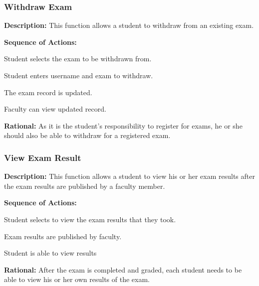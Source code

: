    \subsubsection{\large Withdraw Exam} 
   \begin{boxed} %
      \textbf{Description:}
      {\small This function allows a student to withdraw from an existing exam.}
         
         \textbf{Sequence of Actions:}
         \begin{enumerate}
               {\small
            \item Student selects the exam to be withdrawn from.
            \item Student enters username and exam to withdraw.
            \item The exam record is updated.
            \item Faculty can view updated record.}
         \end{enumerate}

         \textbf{Rational:}
         {\small As it is the student's responsibility to register for exams, he or she
         should also be able to withdraw for a registered exam.}
   \end{boxed} %

   \subsubsection{\large View Exam Result} 
   \begin{boxed} %
      \textbf{Description:}
      {\small This function allows a student to view his or her exam results after
      the exam results are published by a faculty member.}
         
         \textbf{Sequence of Actions:}
         \begin{enumerate}
               {\small
            \item Student selects to view the exam results that they took.
            \item Exam results are published by faculty.
            \item Student is able to view results}
         \end{enumerate}

         \textbf{Rational:}
         {\small After the exam is completed and graded, each student needs to
         be able to view his or her own results of the exam.}
   \end{boxed} %

